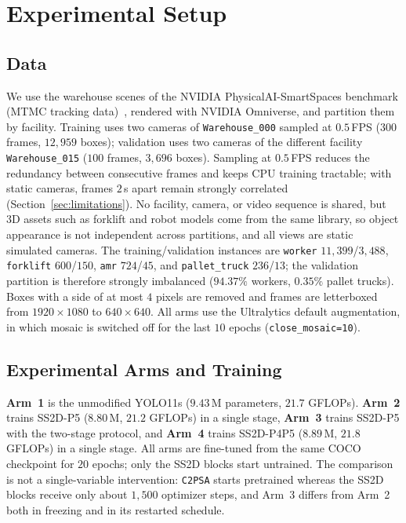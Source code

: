 \section{Experimental Setup}
\label{sec:experimental_setup}

\subsection{Data}
\label{sec:exp_datasets}
We use the warehouse scenes of the NVIDIA PhysicalAI-SmartSpaces benchmark (MTMC tracking data)~\cite{wang2026smartspaces}, rendered with NVIDIA Omniverse, and partition them by facility. Training uses two cameras of \texttt{Warehouse\_000} sampled at $0.5$\,FPS ($300$ frames, $12{,}959$ boxes); validation uses two cameras of the different facility \texttt{Warehouse\_015} ($100$ frames, $3{,}696$ boxes). Sampling at $0.5$\,FPS reduces the redundancy between consecutive frames and keeps CPU training tractable; with static cameras, frames $2$\,s apart remain strongly correlated (Section~\ref{sec:limitations}). No facility, camera, or video sequence is shared, but 3D assets such as forklift and robot models come from the same library, so object appearance is not independent across partitions, and all views are static simulated cameras. The training/validation instances are \texttt{worker} $11{,}399$/$3{,}488$, \texttt{forklift} $600$/$150$, \texttt{amr} $724$/$45$, and \texttt{pallet\_truck} $236$/$13$; the validation partition is therefore strongly imbalanced ($94.37\%$ workers, $0.35\%$ pallet trucks). Boxes with a side of at most $4$ pixels are removed and frames are letterboxed from $1920 \times 1080$ to $640 \times 640$. All arms use the Ultralytics default augmentation, in which mosaic is switched off for the last $10$ epochs (\texttt{close\_mosaic=10}).

\subsection{Experimental Arms and Training}
\label{sec:exp_baselines}
\textbf{Arm~1} is the unmodified YOLO11s ($9.43$\,M parameters, $21.7$ GFLOPs). \textbf{Arm~2} trains SS2D-P5 ($8.80$\,M, $21.2$ GFLOPs) in a single stage, \textbf{Arm~3} trains SS2D-P5 with the two-stage protocol, and \textbf{Arm~4} trains SS2D-P4P5 ($8.89$\,M, $21.8$ GFLOPs) in a single stage. All arms are fine-tuned from the same COCO checkpoint for $20$ epochs; only the SS2D blocks start untrained. The comparison is not a single-variable intervention: \texttt{C2PSA} starts pretrained whereas the SS2D blocks receive only about $1{,}500$ optimizer steps, and Arm~3 differs from Arm~2 both in freezing and in its restarted schedule.

